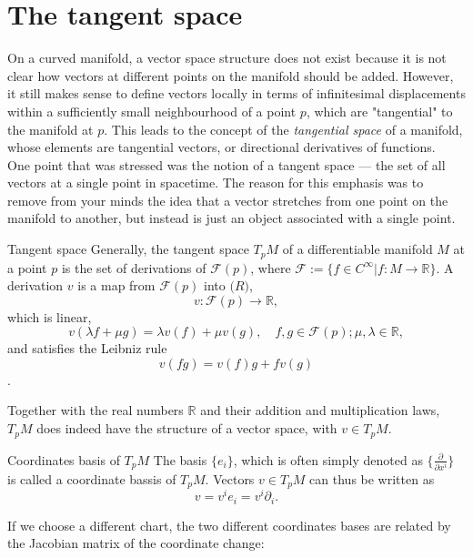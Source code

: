 \section{The tangent space}
On a curved manifold, a vector space structure does not exist because it is not clear how vectors at different points on the manifold should be added. However, it still makes sense to define vectors locally in terms of infinitesimal displacements within a sufficiently small neighbourhood of a point $p$, which are "tangential" to the manifold at $p$. This leads to the concept of the \emph{tangential space} of a manifold, whose elements are tangential vectors, or directional derivatives of functions. \\
One point that was stressed was the notion of a tangent space
— the set of all vectors at a single point in spacetime. The reason for this emphasis was to
remove from your minds the idea that a vector stretches from one point on the manifold to
another, but instead is just an object associated with a single point.
\begin{mybox}{Tangent space}
Generally, the tangent space $T_p M$ of a differentiable manifold $M$ at a point $p$ is the set of derivations of $\mathcal{F}(p)$, where $\mathcal{F}:=\{f \in C^{\infty} | f:M \rightarrow \mathbb{R}\}$. A derivation $v$ is a map from $\mathcal{F}(p)$ into $\mathbb(R)$,
\begin{equation}
	v: \mathcal{F}(p) \rightarrow \mathbb{R},
\end{equation} 
which is linear,
\[v(\lambda f + \mu g) = \lambda v(f) + \mu v(g),  \quad f,g\in \mathcal{F}(p); \mu, \lambda \in \mathbb{R}, \]
and satisfies the Leibniz rule
\[v(fg) = v(f) g + f v(g)\].

\end{mybox}
Together with the real numbers $\mathbb{R}$ and their addition and multiplication laws, $T_pM$ does indeed have the structure of a vector space, with $v \in T_p M$.
\\
\begin{mybox}{Coordinates basis of $T_pM$}
The basis $\{e_i\} $, which is often simply denoted as $\{\frac{\partial}{\partial x^i}\}$ is called a coordinate bassis of $T_pM$. Vectors $v\in T_p M$ can thus be written as 
\begin{equation}
	v = v^i e_i = v^i \partial_i.
\end{equation}
\end{mybox}
If we choose a different chart, the two different coordinates bases are related by the Jacobian matrix of the coordinate change:
